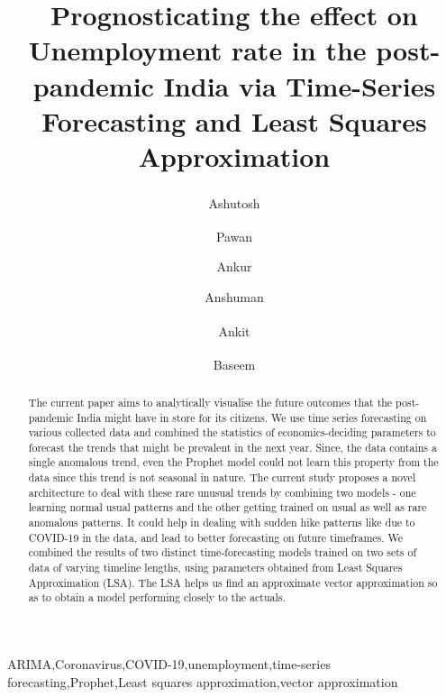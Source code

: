 \documentclass[times,twocolumn,final,authoryear]{elsarticle}
\newcommand\orcidicon[1]{\href{https://orcid.org/#1}{\mbox{\scalerel*{
				\begin{tikzpicture}[yscale=-1,transform shape]
					\pic{orcidlogo};
				\end{tikzpicture}
			}{|}}}}
\begin{document}
	
	\ifpreprint
	\setcounter{page}{1}
	\else
	\setcounter{page}{1}
	\fi
	
	\begin{frontmatter}
		
		\title{Prognosticating the effect on Unemployment rate in the post-pandemic India via Time-Series Forecasting and Least Squares Approximation}
		
		\author[1]{Ashutosh \textsuperscript{\orcidicon{0000-0002-0692-4883}}}
		\author[1]{Pawan \textsuperscript{\orcidicon{0000-0002-1342-9493}}}
		\author[1]{Ankur }
		\author[1]{Anshuman }
		\author[2]{Ankit \textsuperscript{\orcidicon{0000-0002-8026-4246}}}
		\author[3]{Baseem \textsuperscript{\orcidicon{0000-0002-5082-8311}}}
		
		
		\address[1]{\small Dept. of Computer Science and Engineering, Amity University, Lucknow, India.}
		\address[2]{Department of CSE \& IT, Jaypee Institute of Information Technology, Noida, India.}
		\address[3]{Dept. of Electrical and Computer Engineering, Hawassa University, Hawassa P.O. Box 05, Ethiopia.}
		
		
		
		\begin{abstract}
			The current paper aims to analytically visualise the future outcomes that the post-pandemic India might have in store for its citizens. We use time series forecasting on various collected data and combined the statistics of economics-deciding parameters to forecast the trends that might be prevalent in the next year. Since, the data contains a single anomalous trend, even the Prophet model could not learn this property from the data since this trend is not seasonal in nature. The current study proposes a novel architecture to deal with these rare unusual trends by combining two models - one learning normal usual patterns and the other getting trained on usual as well as rare anomalous patterns. It could help in dealing with sudden hike patterns like due to COVID-19 in the data, and lead to better forecasting on future timeframes. We combined the results of two distinct time-forecasting models trained on two sets of data of varying timeline lengths, using parameters obtained from Least Squares Approximation (LSA). The LSA helps us find an approximate vector approximation so as to obtain a model performing closely to the actuals.						
		\end{abstract}
		
		\begin{keyword}
			ARIMA\sep Coronavirus\sep COVID-19\sep unemployment\sep time-series forecasting\sep Prophet\sep Least squares approximation\sep vector approximation
		\end{keyword}
		
	\end{frontmatter}
	
\end{document}
